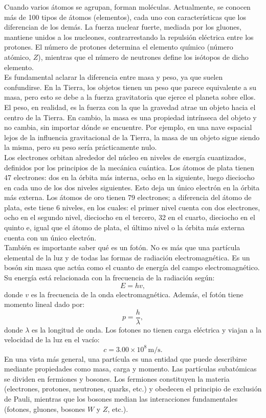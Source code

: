 \noindent 
Cuando varios átomos se agrupan, forman moléculas. Actualmente, se conocen más de 100 tipos de átomos (elementos), cada uno con características que los diferencian de los demás. La fuerza nuclear fuerte, mediada por los gluones, mantiene unidos a los nucleones, contrarrestando la repulsión eléctrica entre los protones. El número de protones determina el elemento químico (número atómico, $Z$), mientras que el número de neutrones define los isótopos de dicho elemento.\\

\noindent 
Es fundamental aclarar la diferencia entre masa y peso, ya que suelen confundirse. En la Tierra, los objetos tienen un peso que parece equivalente a su masa, pero esto se debe a la fuerza gravitatoria que ejerce el planeta sobre ellos. El peso, en realidad, es la fuerza con la que la gravedad atrae un objeto hacia el centro de la Tierra. En cambio, la masa es una propiedad intrínseca del objeto y no cambia, sin importar dónde se encuentre. Por ejemplo, en una nave espacial lejos de la influencia gravitacional de la Tierra, la masa de un objeto sigue siendo la misma, pero su peso sería prácticamente nulo.\\

\noindent 
Los electrones orbitan alrededor del núcleo en niveles de energía cuantizados, definidos por los principios de la mecánica cuántica. Los átomos de plata tienen 47 electrones: dos en la órbita más interna, ocho en la siguiente, luego dieciocho en cada uno de los dos niveles siguientes. Esto deja un único electrón en la órbita más externa. Los átomos de oro tienen 79 electrones; a diferencia del átomo de plata, este tiene 6 niveles, en los cuales: el primer nivel cuenta con dos electrones, ocho en el segundo nivel, dieciocho en el tercero, 32 en el cuarto, dieciocho en el quinto e, igual que el átomo de plata, el último nivel o la órbita más externa cuenta con un único electrón.\\

\noindent 
También es importante saber qué es un fotón. No es más que una partícula elemental de la luz y de todas las formas de radiación electromagnética. Es un bosón sin masa que actúa como el cuanto de energía del campo electromagnético. Su energía está relacionada con la frecuencia de la radiación según:
\[
E = h v,
\]
\noindent 
donde $v$ es la frecuencia de la onda electromagnética. Además, el fotón tiene momento lineal dado por:
\[
p = \frac{h}{\lambda},
\]
\noindent 
donde $\lambda$ es la longitud de onda. Los fotones no tienen carga eléctrica y viajan a la velocidad de la luz en el vacío:
\[
c = 3.00 \times 10^8 \, \text{m/s}.
\]
\noindent 
En una vista más general, una partícula es una entidad que puede describirse mediante propiedades como masa, carga y momento. Las partículas subatómicas se dividen en fermiones y bosones. Los fermiones constituyen la materia (electrones, protones, neutrones, quarks, etc.) y obedecen el principio de exclusión de Pauli, mientras que los bosones median las interacciones fundamentales (fotones, gluones, bosones $W$ y $Z$, etc.).

